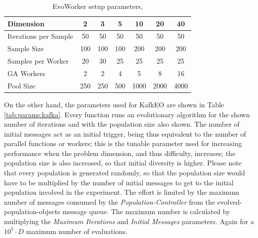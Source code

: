 \documentclass{llncs}
\begin{document}
  \begin{table}
    \small
    \caption{EvoWorker setup parameters,
    }
    \label{tab:params:evoworkers}
    \centering
    \small
    \begin{tabular}{|l|c|c|c|c|c|c|}
      \hline
      Dimension & 2 & 3 & 5 & 10 & 20 & 40\\ \hline
      Iterations per Sample  & 50 & 50 & 50 & 50 & 50 & 50\\ \hline
      Sample Size  & 100 & 100 & 100 & 200 & 200 & 200 \\ \hline
      Samples per Worker & 20 & 30 & 25 & 25 & 25 & 25  \\ \hline
      GA Workers & 2 & 2 & 4 & 5 & 8 & 16  \\ \hline
      Pool Size & 250 & 250 & 500 & 1000 & 2000 & 4000  \\ \hline
    \end{tabular}
  \end{table}

  On the other hand, the parameters used for KafkEO are shown in Table
  \ref{tab:params:kafka}. Every function runs an evolutionary algorithm
  for the shown number of iterations and with the population size also
  shown. The number of initial messages act as an initial trigger, being
  thus equivalent to the number of parallel functions or workers; this is the
  tunable parameter used for increasing performance when the problem
  dimension, and thus difficulty, increases; the population size is also
  increased, so that initial diversity is higher. Please note that every
  population is generated randomly, so that the population size would
  have to be multiplied by the number of initial messages to get to the
  initial population involved in the experiment. The effort is limited by the
  maximum number of messages consumed by the {\em Population-Controller} from
   the  {\sf evolved-population-objects} message queue. The maximum number is
    calculated by multiplying the {\em  Maximum Iterations} and {\em Initial
   Messages} parameters. Again for a $10^5 \cdot D$ maximum number of evaluations.
\end{document}
